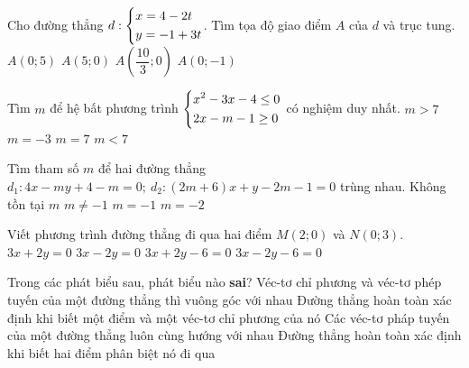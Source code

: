 \begin{ex}%
Cho đường thẳng $d:\left\{\begin{aligned}&x=4-2t\\&y=-1+3t\end{aligned}\right.$. Tìm tọa độ giao điểm $A$ của $d$ và trục tung.
\choice
{\True $A(0;5)$}
{$A(5;0)$}
{$A\left(\dfrac{10}{3};0\right)$}
{$A(0;-1)$}
\end{ex}
\begin{ex}%
Tìm $m$ để hệ bất phương trình $\left\{\begin{aligned}&x^2-3x-4\le 0\\&2x-m-1\ge 0\end{aligned}\right.$ có nghiệm duy nhất.
\choice
{$m>7$}
{$m=-3$}
{\True $m=7$}
{$m<7$}
\end{ex}
\begin{ex}%
Tìm tham số $m$ để hai đường thẳng $d_1: 4x-my+4-m=0;\ d_2:(2m+6)x+y-2m-1=0$ trùng nhau.
\choice
{\True Không tồn tại $m$}
{$m\ne -1$}
{$m=-1$}
{$m=-2$}
\end{ex}
\begin{ex}%
Viết phương trình đường thẳng đi qua hai điểm $M(2;0)$ và $N(0;3)$.
\choice
{$3x+2y=0$}
{$3x-2y=0$}
{\True $3x+2y-6=0$}
{$3x-2y-6=0$}
\end{ex}
\begin{ex}%
Trong các phát biểu sau, phát biểu nào \textbf{sai}?
\choice
{Véc-tơ chỉ phương và véc-tơ phép tuyến của một đường thẳng thì vuông góc với nhau}
{Đường thẳng hoàn toàn xác định khi biết một điểm và một véc-tơ chỉ phương của nó}
{\True Các véc-tơ pháp tuyến của một đường thẳng luôn cùng hướng với nhau}
{Đường thẳng hoàn toàn xác định khi biết hai điểm phân biệt nó đi qua}
\end{ex}
